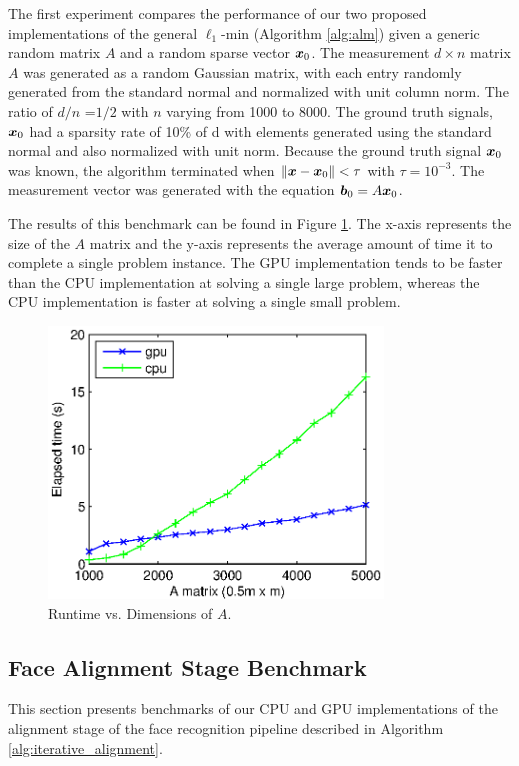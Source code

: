 \documentclass[10pt,twocolumn,letterpaper]{article}
\begin{document}
The first experiment compares the performance of our two proposed
implementations of the general $\ell_1$-min (Algorithm \eqref{alg:alm}) given a
generic random matrix $A$ and a random sparse vector ${\boldsymbol{x}}_0$.  The measurement
$d \times n$ matrix $A$ was generated as a random Gaussian matrix, with each
entry randomly generated from the standard normal and normalized with unit
column norm.  The ratio of $d/n$ =$1/2$ with $n$ varying from 1000 to 8000.
The ground truth signals, ${\boldsymbol{x}}_0$ had a sparsity rate of 10\% of d with
elements generated using the standard normal and also normalized with unit
norm.  Because the ground truth signal ${\boldsymbol{x}}_0$ was known, the algorithm
terminated when $\|{\boldsymbol x}-{\boldsymbol x}_0\| < \tau$ with $\tau=10^{-3}$.  The measurement
vector was generated with the equation ${\boldsymbol{b}}_0 = A {\boldsymbol{x}}_0$.   

The results of this benchmark can be found in Figure \ref{fig:random_data}.
The x-axis represents the size of the $A$ matrix and the y-axis represents the
average amount of time it to complete a single problem instance.  The GPU
implementation tends to be faster than the CPU implementation at solving a
single large problem, whereas the CPU implementation is faster at solving a
single small problem.  
\begin{figure}
\begin{center}
\includegraphics[width=3.5in]{figures/time_vs_matrix_size_constant_tol}
\end{center}
\caption{Runtime vs. Dimensions of $A$.}
\label{fig:random_data}
\end{figure}

\subsection{Face Alignment Stage Benchmark} 
\label{sec:alignment_benchmark}
This section presents benchmarks of our CPU and GPU implementations of the
alignment stage of the face recognition pipeline described in Algorithm
\ref{alg:iterative_alignment}.  
\end{document}
